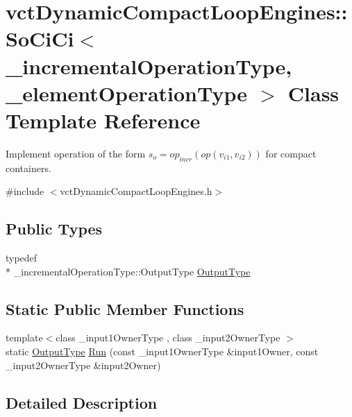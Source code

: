 \hypertarget{classvct_dynamic_compact_loop_engines_1_1_so_ci_ci}{\section{vct\-Dynamic\-Compact\-Loop\-Engines\-:\-:So\-Ci\-Ci$<$ \-\_\-incremental\-Operation\-Type, \-\_\-element\-Operation\-Type $>$ Class Template Reference}
\label{classvct_dynamic_compact_loop_engines_1_1_so_ci_ci}
}


Implement operation of the form $s_o = op_{incr}(op(v_{i1}, v_{i2}))$ for compact containers.  




{\ttfamily \#include $<$vct\-Dynamic\-Compact\-Loop\-Engines.\-h$>$}

\subsection*{Public Types}
\begin{DoxyCompactItemize}
\item 
typedef \\*
\-\_\-incremental\-Operation\-Type\-::\-Output\-Type \hyperlink{classvct_dynamic_compact_loop_engines_1_1_so_ci_ci_ab00f75cd43ad2aa4ca177a1522f73fe2}{Output\-Type}
\end{DoxyCompactItemize}
\subsection*{Static Public Member Functions}
\begin{DoxyCompactItemize}
\item 
{\footnotesize template$<$class \-\_\-input1\-Owner\-Type , class \-\_\-input2\-Owner\-Type $>$ }\\static \hyperlink{classvct_dynamic_compact_loop_engines_1_1_so_ci_ci_ab00f75cd43ad2aa4ca177a1522f73fe2}{Output\-Type} \hyperlink{classvct_dynamic_compact_loop_engines_1_1_so_ci_ci_af8e68cdb182a4db1edcdcc4fa00c545c}{Run} (const \-\_\-input1\-Owner\-Type \&input1\-Owner, const \-\_\-input2\-Owner\-Type \&input2\-Owner)
\end{DoxyCompactItemize}


\subsection{Detailed Description}
